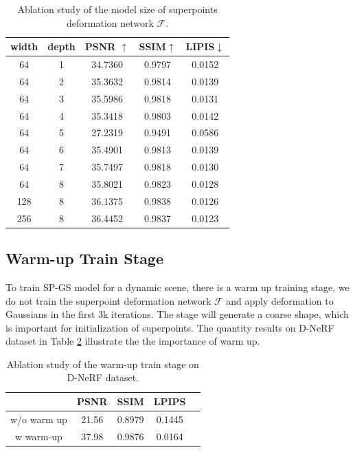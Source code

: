 \begin{table}[htb]
    \centering
    \caption{Ablation study of the model size of superpoints deformation network $\mathcal{F}$.}
    \label{tab:model-size}
    \begin{tabular}{cc|ccc}
        \toprule
        width & depth & PSNR $\uparrow$ &SSIM$\uparrow$ & LIPIS$\downarrow$ \\
        \midrule
        64 & 1 &  34.7360 & 0.9797 & 0.0152 \\
        64 & 2 &  35.3632 & 0.9814 & 0.0139 \\
        64 & 3 &  35.5986 & 0.9818 & 0.0131 \\
        64 & 4 &  35.3418 & 0.9803 & 0.0142 \\
        64 & 5 &  27.2319 & 0.9491 & 0.0586 \\
        64 & 6 &  35.4901 & 0.9813 & 0.0139 \\
        64 & 7 &  35.7497 & 0.9818 & 0.0130 \\
        64 & 8 &  35.8021 & 0.9823 & 0.0128 \\
        128 & 8 & 36.1375 & 0.9838 & 0.0126 \\
        256 & 8 & 36.4452 & 0.9837 & 0.0123 \\
        \bottomrule
    \end{tabular}
\end{table}

\subsection{Warm-up Train Stage}
To train SP-GS model for a dynamic scene, there is a warm up training stage, \ie we do not train the superpoint deformation network $\mathcal{F}$ and apply deformation to Gaussians in the first 3k iterations. The stage will generate a coarse shape, which is important for initialization of superpoints. The quantity results on D-NeRF dataset  in Table \ref{tab:ab-warm-up} illustrate the the importance of warm up.

\begin{table}[htb]
    \centering
    \caption{Ablation study of the warm-up train stage on D-NeRF dataset.}
    \label{tab:ab-warm-up}
    \begin{tabular}{c*{4}{c}}
    \toprule
    & PSNR & SSIM & LPIPS \\ \midrule
       w/o warm up  & 21.56 & 0.8979 & 0.1445 \\
        w warm-up   & 37.98 & 0.9876 & 0.0164\\
        \bottomrule
    \end{tabular}
\end{table}

